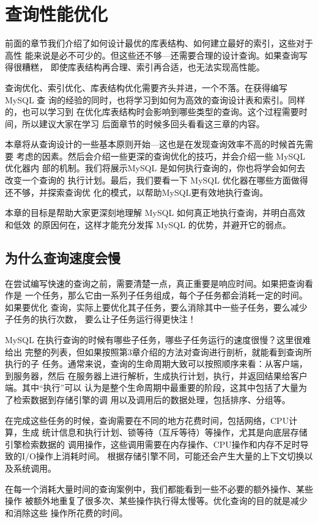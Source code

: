 \chapter{查询性能优化}
前面的章节我们介绍了如何设计最优的库表结构、如何建立最好的索引，这些对于高性
能来说是必不可少的。但这些还不够—还需要合理的设计查询。如果查询写得很糟糕，
即使库表结构再合理、索引再合适，也无法实现高性能。

查询优化、索引优化、库表结构优化需要齐头并进，一个不落。在获得编写MySQL 查
询的经验的同时，也将学习到如何为高效的查询设计表和索引。同样的，也可以学习到
在优化库表结构时会影响到哪些类型的查询。这个过程需要时间，所以建议大家在学习
后面章节的时候多回头看看这三章的内容。

本章将从查询设计的一些基本原则开始—这也是在发现查询效率不高的时候首先需要
考虑的因素。然后会介绍一些更深的查询优化的技巧，并会介绍一些 MySQL 优化器内
部的机制。我们将展示MySQL 是如何执行查询的，你也将学会如何去改变一个查询的
执行计划。最后，我们要看一下 MySQL 优化器在哪些方面做得还不够，并探索查询优
化的模式，以帮助MySQL更有效地执行查询。

本章的目标是帮助大家更深刻地理解 MySQL 如何真正地执行查询，并明白高效和低效
的原因何在，这样才能充分发挥 MySQL 的优势，并避开它的弱点。

\section{为什么查询速度会慢}
在尝试编写快速的查询之前，需要清楚一点，真正重要是响应时间。如果把查询看作是
一个任务，那么它由一系列子任务组成，每个子任务都会消耗一定的时间。如果要优化
查询，实际上要优化其子任务，要么消除其中一些子任务，要么减少子任务的执行次数，
要么让子任务运行得更快注！

MySQL 在执行查询的时候有哪些子任务，哪些子任务运行的速度很慢？这里很难给出
完整的列表，但如果按照第3章介绍的方法对查询进行剖析，就能看到查询所执行的子
任务。通常来说，查询的生命周期大致可以按照顺序来看：从客户端，到服务器，然后
在服务器上进行解析，生成执行计划，执行，并返回结果给客户端。其中“执行”可以
认为是整个生命周期中最重要的阶段，这其中包括了大量为了检索数据到存储引擎的调
用以及调用后的数据处理，包括排序、分组等。

在完成这些任务的时候，查询需要在不同的地方花费时间，包括网络，CPU计算，生成
统计信息和执行计划、锁等待（互斥等待）等操作，尤其是向底层存储引擎检索数据的
调用操作，这些调用需要在内存操作、CPU操作和内存不足时导致的I/O操作上消耗时间。
根据存储引擎不同，可能还会产生大量的上下文切换以及系统调用。

在每一个消耗大量时间的查询案例中，我们都能看到一些不必要的额外操作、某些操作
被额外地重复了很多次、某些操作执行得太慢等。优化查询的目的就是减少和消除这些
操作所花费的时间。


